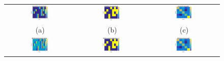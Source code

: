 \documentclass{article}
\begin{document}
\begin{figure}
	\centering
	\begin{tabular}{cc|c}
	  \includegraphics[width=0.3\textwidth]{figure/GT_in_out_3states.png} &   \includegraphics[width=0.3\textwidth]{figure/GT_in_out_bin.png} &\includegraphics[width=0.3\textwidth]{figure/GT_out_out.png} \\
	(a) & (b)  & (c) \\
		  \includegraphics[width=0.3\textwidth]{figure/MGrec_in_out_3states.png} &   \includegraphics[width=0.3\textwidth]{figure/MGrec_in_out_bin.png} &\includegraphics[width=0.3\textwidth]{figure/MG_out_out.png} \\

\end{tabular}
\end{figure}
\end{document}
